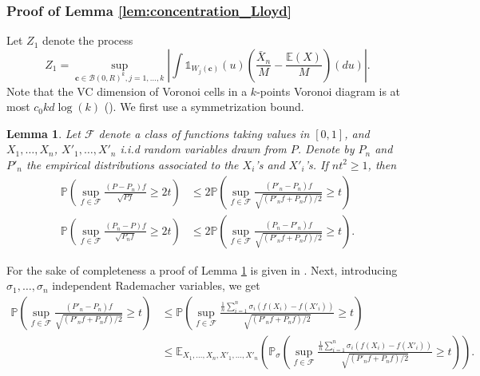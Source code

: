 \documentclass[noinfoline,preprint]{article}
\newtheorem{lem}[theorem]{Lemma}
\newcommand{\cb}{\mathbf{c}}
\newcommand{\E}{\mathbb{E}}
\renewcommand{\1}{\mathds 1}
\newcommand{\B}{\mathcal{B}}
\begin{document}
\subsubsection{Proof of Lemma \ref{lem:concentration_Lloyd}}\label{sec:proof_lem_concentration_Lloyd}
Let $Z_1$ denote the process
\[
Z_1 = \sup_{\cb \in \B(0,R)^k, j=1, \hdots, k} \left |  \int \1_{W_j(\cb)}(u)\left ( \frac{\bar{X}_n}{M} - \frac{\mathbb{E}(X)}{M} \right )(du) \right |.
\]
Note that the VC dimension of Voronoi cells in a $k$-points Voronoi diagram is at most $c_0 kd \log(k)$ (\cite[Theorem 1.1]{vanderVaart09}). We first use a symmetrization bound.
\begin{lem}\label{lem:symmetrizationnromalized}
Let $\mathcal{F}$ denote a class of functions taking values in $[0,1]$, and $X_1, \hdots, X_n$, $X'_1, \hdots, X'_n$ i.i.d random variables drawn from $P$. Denote by $P_n$ and $P'_n$ the empirical distributions associated to the $X_i$'s and $X'_i$'s. If $nt^2 \geq 1$, then
\begin{align*}
\mathbb{P} \left ( \sup_{f \in \mathcal{F}} \frac{(P-P_n)f}{\sqrt{Pf}} \geq 2t \right ) & \leq 2 \mathbb{P} \left ( \sup_{f \in \mathcal{F} } \frac{(P'_n-P_n)f}{\sqrt{(P'_n f + P_nf)/2}} \geq t \right ) \\
\mathbb{P} \left ( \sup_{f \in \mathcal{F}} \frac{(P_n-P)f}{\sqrt{P_nf}} \geq 2t \right ) & \leq 2 \mathbb{P} \left ( \sup_{f \in \mathcal{F} } \frac{(P_n-P'_n)f}{\sqrt{(P'_n f + P_nf)/2}} \geq t \right ).
\end{align*}
\end{lem}
For the sake of completeness a proof of Lemma \ref{lem:symmetrizationnromalized} is given in . Next, introducing $\sigma_1, \hdots,  \sigma_n$ independent Rademacher variables, we get
\begin{align*}
\mathbb{P} \left ( \sup_{f \in \mathcal{F} } \frac{(P'_n-P_n)f}{\sqrt{(P'_n f + P_nf)/2}} \geq t \right ) & \leq \mathbb{P} \left ( \sup_{f \in \mathcal{F} } \frac{\frac{1}{n} \sum_{i=1}^n{\sigma_i (f(X_i) - f(X'_i))}}{\sqrt{(P'_n f + P_nf)/2}} \geq t \right ) \\
& \leq \mathbb{E}_{X_1, \hdots, X_n, X'_1, \hdots, X'_n} \left ( \mathbb{P}_{\sigma} \left ( \sup_{f \in \mathcal{F} } \frac{\frac{1}{n} \sum_{i=1}^n{\sigma_i (f(X_i) - f(X'_i))}}{\sqrt{(P'_n f + P_nf)/2}} \geq t \right ) \right ). 
\end{align*}
\end{document}
